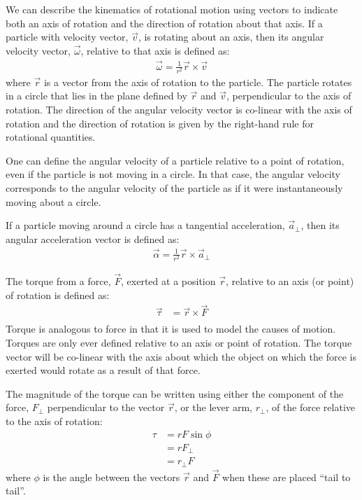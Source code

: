 \begin{chapterSummary}
We can describe the kinematics of rotational motion using vectors to indicate both an axis of rotation and the direction of rotation about that axis. If a particle with velocity vector, $\vec v$, is rotating about an axis, then its angular velocity vector, $\vec\omega$, relative to that axis is defined as:
\begin{align*}
\vec\omega = \frac{1}{r^2}\vec r \times \vec v
\end{align*}
where $\vec r$ is a vector from the axis of rotation to the particle. The particle rotates in a circle that lies in the plane defined by $\vec r$ and $\vec v$, perpendicular to the axis of rotation. The direction of the angular velocity vector is co-linear with the axis of rotation and the direction of rotation is given by the right-hand rule for rotational quantities. 

One can define the angular velocity of a particle relative to a point of rotation, even if the particle is not moving in a circle. In that case, the angular velocity corresponds to the angular velocity of the particle as if it were instantaneously moving about a circle. 

If a particle moving around a circle has a tangential acceleration, $\vec a_\perp$, then its angular acceleration vector is defined as:
\begin{align*}
\vec\alpha = \frac{1}{r^2}\vec r \times \vec a_\perp
\end{align*}


The torque from a force, $\vec F$, exerted at a position $\vec r$, relative to an axis (or point) of rotation is defined as:
\begin{align*}
\vec\tau &= \vec r \times \vec F\\
\end{align*}
Torque is analogous to force in that it is used to model the causes of motion. Torques are only ever defined relative to an axis or point of rotation. The torque vector will be co-linear with the axis about which the object on which the force is exerted would rotate as a result of that force.

The magnitude of the torque can be written using either the component of the force, $F_\perp$ perpendicular to the vector $\vec r$, or the lever arm, $r_\perp$, of the force relative to the axis of rotation:
\begin{align*}
\tau &= rF\sin\phi\\
&=rF_\perp\\
&=r_\perp F
\end{align*}
where $\phi$ is the angle between the vectors $\vec r$ and $\vec F$ when these are placed ``tail to tail''.


\end{chapterSummary}
